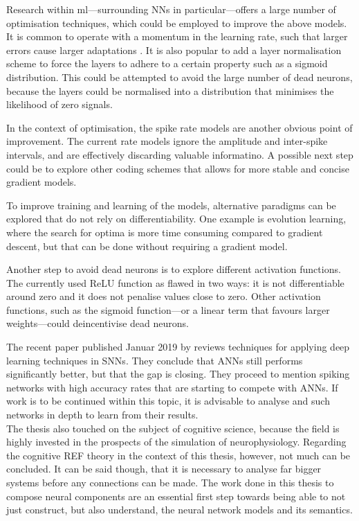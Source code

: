 \documentclass[report.tex]{subfiles}
\begin{document}
Research within \gls{ml}---surrounding \glspl{NN} in particular---offers a large
number of optimisation techniques, which could be employed to improve the above
models.
It is common to operate with a momentum in the learning rate, such that
larger errors cause larger adaptations \cite{Montavon1998, Sutskever2013}.
It is also popular to add a layer normalisation scheme to force the layers to
adhere to a certain property such as a sigmoid distribution.
This could be attempted to avoid the large number of dead neurons, because the
layers could be normalised into a distribution that minimises the likelihood of
zero signals.

In the context of optimisation, the spike rate models are another obvious point
of improvement.
The current rate models ignore the amplitude and inter-spike intervals, and are
effectively discarding valuable informatino.
A possible next step could be to explore other coding schemes that
allows for more stable and concise gradient models.

To improve training and learning of the models, alternative paradigms can be explored that do not
rely on differentiability. 
One example is evolution learning, where the search for optima is more time 
consuming compared to gradient descent, but that can be done without requiring a gradient model.

Another step to avoid dead neurons is to explore different activation functions. 
The currently used ReLU function as flawed in two ways: it is not
differentiable around zero and it does not penalise values close to
zero.
Other activation functions, such as the sigmoid function---or a linear term
that favours larger weights---could deincentivise dead neurons.

The recent paper published Januar 2019 by \citeauthor{Tavanei2019} reviews
techniques for applying deep learning techniques in \glspl{SNN}.
They conclude that \glspl{ANN} still performs significantly better, but that the
gap is closing.
They proceed to mention spiking networks with high accuracy rates that are starting to
compete with \glspl{ANN}. 
If work is to be continued within this topic, it is advisable to analyse and
such networks in depth to learn from their results.
\\[0.1cm]

The thesis also touched on the subject of cognitive science, because the field
is highly invested in the prospects of the simulation of neurophysiology.
Regarding the cognitive REF theory in the context of this thesis, however, not much can be concluded.
It can be said though, that it is necessary to analyse far bigger systems before
any connections can be made.
The work done in this thesis to compose neural components are an essential first
step towards being able to not just construct, but also understand, the neural
network models and its semantics.
\\[0.1cm]
\end{document}
